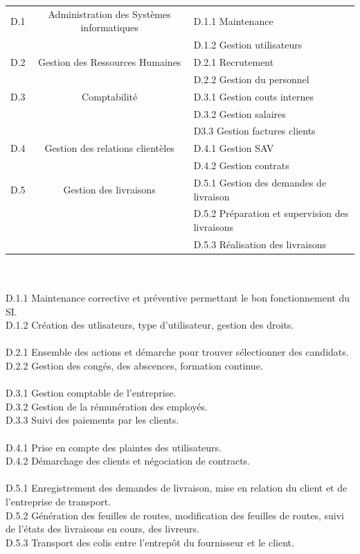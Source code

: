 \documentclass{report}
\begin{document}
\begin{tabular}{|c|c|l|}
\hline
D.1 & Administration des Systèmes informatiques& D.1.1 Maintenance\\
&&																							 D.1.2 Gestion utilisateurs\\
\hline
D.2 & Gestion des Ressources Humaines & D.2.1 Recrutement\\
&&																			D.2.2 Gestion du personnel\\
\hline
D.3 & Comptabilité & D.3.1 Gestion couts internes\\
&&									 D.3.2 Gestion salaires\\
&&									D3.3 Gestion factures clients\\
\hline
D.4 & Gestion des relations clientèles & D.4.1 Gestion SAV\\
&&																			D.4.2 Gestion contrats\\
\hline
D.5 &  Gestion des livraisons & D.5.1 Gestion des demandes de livraison\\
&&															D.5.2 Préparation et supervision des livraisons\\
&&															D.5.3 Réalisation des livraisons\\
\hline
\end{tabular}
~~\\
~~\\
D.1.1 Maintenance corrective et préventive permettant le bon fonctionnement du SI.\\
D.1.2 Création des utlisateurs, type d’utilisateur, gestion des droits.\\
~~\\
D.2.1 Ensemble des actions et démarche pour trouver sélectionner des candidats.\\
D.2.2 Gestion des congés, des abscences, formation continue.\\
~~\\
D.3.1 Gestion comptable de l’entreprise.\\
D.3.2 Gestion de la rémunération des employés.\\
D.3.3 Suivi des paiements par les clients.\\
~~\\
D.4.1 Prise en compte des plaintes des utilisateurs.\\
D.4.2 Démarchage des clients et négociation de contracts.\\
~~\\
D.5.1  Enregistrement des demandes de livraison, mise en relation du client et de l’entreprise de transport.\\
D.5.2 Génération des feuilles de routes, modification des feuilles de routes, suivi de l’états des livraisons en cours, des livreurs.\\
D.5.3 Transport des colis entre l'entrepôt du fournisseur et le client.\\
\end{document}
